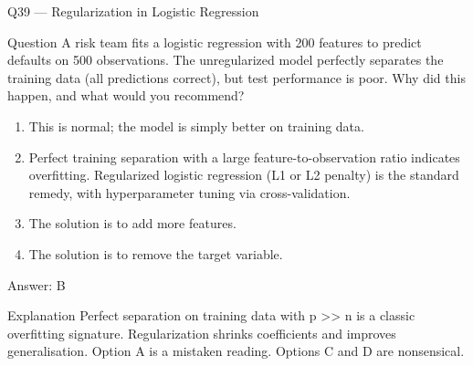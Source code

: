 \documentclass[aspectratio=169,8pt]{beamer}
\begin{document}
	\begin{frame}{Q39 --- Regularization in Logistic Regression}
		\begin{block}{Question}
			A risk team fits a logistic regression with 200 features to predict defaults on 500 observations. The unregularized model perfectly separates the training data (all predictions correct), but test performance is poor. Why did this happen, and what would you recommend?
		\end{block}
		\begin{enumerate}
			\item This is normal; the model is simply better on training data.
			\item Perfect training separation with a large feature-to-observation ratio indicates overfitting. Regularized logistic regression (L1 or L2 penalty) is the standard remedy, with hyperparameter tuning via cross-validation.
			\item The solution is to add more features.
			\item The solution is to remove the target variable.
		\end{enumerate}
		\begin{exampleblock}{Answer: B}\end{exampleblock}
		\begin{block}{Explanation}
			Perfect separation on training data with p >> n is a classic overfitting signature. Regularization shrinks coefficients and improves generalisation. Option A is a mistaken reading. Options C and D are nonsensical.
		\end{block}
	\end{frame}
	
\end{document}
